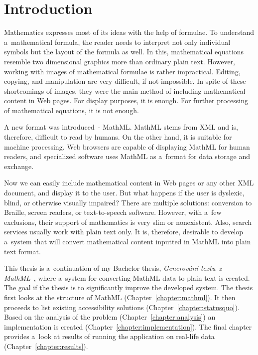 \documentclass[11pt,oneside,final]{fithesis2}
\def\s#1{#1\index{#1}}
\begin{document}
\chapter{Introduction}
Mathematics expresses most of its ideas with the help of formulae. To understand a~mathematical formula, the reader needs to interpret not only individual symbols but the layout of the formula as well. In this, mathematical equations resemble two dimensional graphics more than ordinary plain text. However, working with images of mathematical formulae is rather impractical. Editing, copying, and manipulation are very difficult, if not impossible. In spite of these shortcomings of images, they were the main method of including mathematical content in Web pages. For display purposes, it is enough. For further processing of mathematical equations, it is not enough. 

A new format was introduced~- MathML. MathML stems from XML and is, therefore, difficult to read by humans. On the other hand, it is suitable for machine processing. Web browsers are capable of displaying MathML for human readers, and specialized software uses MathML as a~format for data storage and exchange. 

Now we can easily include mathematical content in Web pages or any other XML document, and display it to the user. But what happens if the user is dyslexic, blind, or otherwise visually impaired? There are multiple solutions: conversion to \s{Braille}, screen readers, or text-to-speech software. However, with a~few exclusions, their support of mathematics is very slim or nonexistent. Also, search services usually work with plain text only. It is, therefore, desirable to develop a~system that will convert mathematical content inputted in MathML into plain text format. 

This thesis is a~continuation of my Bachelor thesis, \textit{Generování textu~z MathML}~\cite{Kucbel2011thesis}, where a~system for converting MathML data to plain text is created. The goal if the thesis is to significantly improve the developed system. The thesis first looks at the structure of MathML (Chapter~\ref{chapter:mathml}). It then proceeds to list existing accessibility solutions (Chapter~\ref{chapter:statusquo}). Based on the analysis of the problem (Chapter~\ref{chapter:analysis}) an implementation is created (Chapter~\ref{chapter:implementation}). The final chapter provides a~look at results of running the application on real-life data (Chapter~\ref{chapter:results}).
\end{document}
